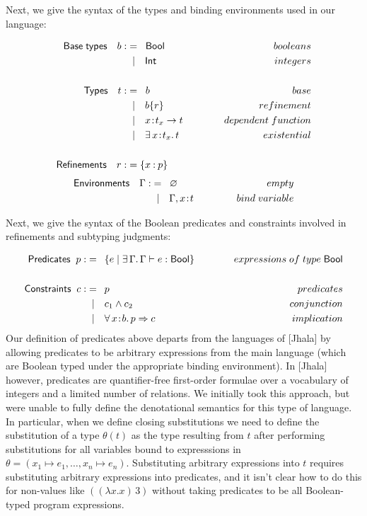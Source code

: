 \documentclass[11pt]{article}
\newcommand{\bind}{\hspace{0.1em}{:}\hspace{0.1em}} %
\newcommand{\col}{\mathbin{:}}       %
\begin{document}
Next, we give the syntax of the types and binding environments used in our language:

\begin{align*}
{\sf Base\; types} \quad b :&=\;\;{\sf Bool}{\kern 5em}&booleans\\
                   &\;\;|\quad {\sf Int} &integers \\ \\
{\sf Types} \quad t :&=\;\; b & base \\
                   &\;\;|\quad b\{r\} & refinement \\
                   &\;\;|\quad x\bind t_x \rightarrow t 
                   &dependent\; function\\
                   &\;\;|\quad \exists\, x\bind t_x.\, t 
                   &existential\\ \\
{\sf Refinements} \quad r :&= \{x\col p\} 
\end{align*}
\begin{align*}
{\sf Environments} \quad \Gamma :&=\;\; \varnothing
                   {\kern 5em}& empty \\
                   &\;\;|\quad \Gamma, x\bind t & bind\;variable\\
\end{align*}

Next, we give the syntax of the Boolean predicates and constraints involved in refinements and subtyping judgments:

\begin{align*}
{\sf Predicates} \;\; p :&=\;\: \{ e \;|\; \exists\, \Gamma.\, 
                   \Gamma \vdash e : {\sf Bool}\}
                   {\kern 3 em}& expressions\; of\; type\; {\sf Bool} \\ \\
{\sf Constraints} \;\; c :&=\;\: p  {\kern 3 em}& predicates\\
                   &\;\;|\quad c_1 \wedge c_2 & conjunction\\
                   &\;\;|\quad\forall\, x\bind b.\, p\Rightarrow c
                   &implication
\end{align*}
Our definition of predicates above departs from the languages of [Jhala] by allowing predicates to be arbitrary expressions from the main language (which are Boolean typed under the appropriate binding environment).
In [Jhala] however, predicates are quantifier-free first-order formulae over a vocabulary of integers and a limited number of relations. We initially took this approach, but were unable to fully define the denotational semantics for this type of language. In particular, when we define closing substitutions we need to define the substitution of a type $\theta(t)$ as the type resulting from $t$ after performing substitutions for all variables bound to expresssions in
$\theta = (x_1 \mapsto e_1, \ldots, x_n \mapsto e_n)$. Substituting arbitrary expressions into $t$ requires substituting arbitrary expressions into predicates, and it isn't clear how to do this for non-values like $((\lambda x. x)\, 3)$ without taking predicates to be all Boolean-typed program expressions. \\
\end{document}
